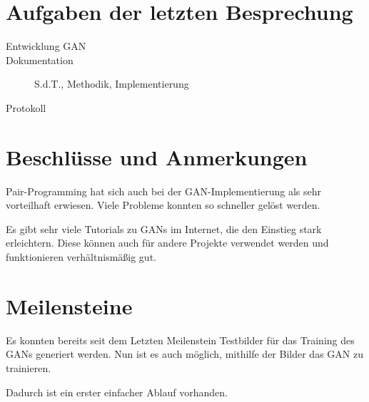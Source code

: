 
\newcommand{\Titel}{4. Protokoll}
\newcommand{\Teilnehmer}{Jonas Bürgel, Patrick Welter}
\newcommand{\DatumUndZeit}{29.11.2021 20:00-20:15}
\newcommand{\Ort}{Discord Meeting}
\newcommand{\Thema}{Entwicklung GAN}


\section{Aufgaben der letzten Besprechung}
\begin{description}
	\item[Entwicklung GAN]  \fullcheck
	\item[Dokumentation] S.d.T., Methodik, Implementierung  \halfcheck
	\item[Protokoll]  \fullcheck
\end{description}

\section{Beschlüsse und Anmerkungen}
\begin{description}[style=nextline]
	\item[Pair-Programming]
	Pair-Programming hat sich auch bei der GAN-Implementierung als sehr vorteilhaft erwiesen.
	Viele Probleme konnten so schneller gelöst werden.
	
	\item[GAN-Tutorials]
	Es gibt sehr viele Tutorials zu GANs im Internet, die den Einstieg stark erleichtern.
	Diese können auch für andere Projekte verwendet werden und funktionieren verhältnismäßig gut.
\end{description}

\section{Meilensteine}
\begin{description}[style=nextline]
	\item[Einfacher Trainingsworkflow mit Testdaten und Generierung \hfill \fullcheck]
	Es konnten bereits seit dem Letzten Meilenstein Testbilder für das Training des GANs generiert werden.
	Nun ist es auch möglich, mithilfe der Bilder das GAN zu trainieren.
	
	Dadurch ist ein erster einfacher Ablauf vorhanden.
\end{description}

